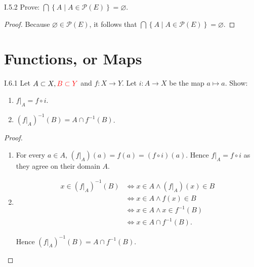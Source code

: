 \begin{problem}{I.5.2}
Prove: \( \bigcap \left\{ A \mid A \in \mathscr{P}(E) \right\} = \varnothing \).
\end{problem}

\begin{proof}
	Because \( \varnothing \in \mathscr{P}(E) \), it follows that \( \bigcap\left\{ A \mid A \in \mathscr{P}(E) \right\} = \varnothing \).
\end{proof}

\section{Functions, or Maps}

\begin{problem}{I.6.1}
Let \( A \subset X, {\color{red}B \subset Y} \) and \( f: X \to Y \). Let \( i: A \to X \) be the map \( a \mapsto a \). Show:
\begin{enumerate}[label={(\alph*)}]
	\item \( f\vert_{A} = f \circ i \).
	\item \( {(f\vert_{A})}^{-1}(B) = A \cap f^{-1}(B) \).
\end{enumerate}
\end{problem}

\begin{proof}
	\begin{enumerate}[label={(\alph*)},leftmargin=*]
		\item For every \( a \in A \), \( (f\vert_{A})(a) = f(a) = (f\circ i)(a) \). Hence \( f\vert_{A} = f \circ i \) as they agree on their domain \( A \).
		\item \begingroup
		      \allowdisplaybreaks%
		      \begin{align*}
			      x \in {(f\vert_{A})}^{-1}(B) & \iff x \in A \land {(f\vert_{A})}(x) \in B \\
			                                   & \iff x \in A \land f(x) \in B              \\
			                                   & \iff x \in A \land x \in f^{-1}(B)         \\
			                                   & \iff x \in A \cap f^{-1}(B).
		      \end{align*}
		      \endgroup

		      Hence \( {(f\vert_{A})}^{-1}(B) = A \cap f^{-1}(B) \).
	\end{enumerate}
\end{proof}

